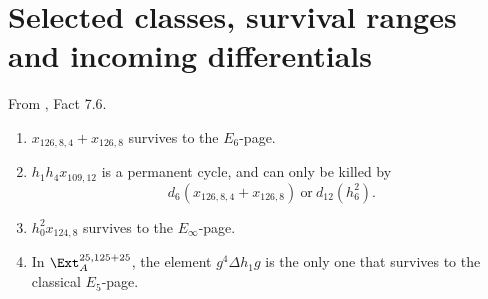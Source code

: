 \section{Selected classes, survival ranges and incoming differentials}

\begin{fact}
\label{paper:7.6}
From \cite{LWX126}, Fact 7.6.\par
\label{fact:theta5sqAF}
\begin{enumerate}
    \item $x_{126,8,4} + x_{126,8}$ survives to the $E_6$-page.
    
    \item $h_1h_4x_{109,12}$ is a permanent cycle, and can only be killed by 
    $$d_6(x_{126,8,4} + x_{126,8}) \ \text{or} \ d_{12}(h_6^2).$$
    
    \item $h_0^2x_{124,8}$ survives to the $E_\infty$-page.

    \item In $\Ext_A^{25,125+25}$, the element $g^4\Delta h_1g$ is the only one that survives to the classical $E_5$-page.
\end{enumerate}



\end{fact}
